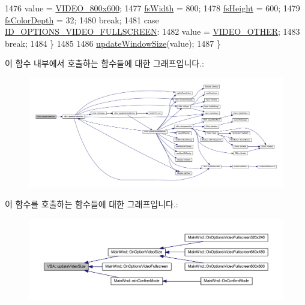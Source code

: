 \begin{DoxyCode}
1476     value = \mbox{\hyperlink{_v_b_a_8h_a531c35e38ede3ea4e5ba5afb24b29493a1849e033b4567855b2eaba899ed43c17}{VIDEO\_800x600}};
1477     \mbox{\hyperlink{class_v_b_a_a92ef1c149914189da4d110d6dada54bb}{fsWidth}} = 800;
1478     \mbox{\hyperlink{class_v_b_a_a1e59d9254f1cb6420502c537c35dd5ec}{fsHeight}} = 600;
1479     \mbox{\hyperlink{class_v_b_a_a1baf02b3f4ad129bfd713f1a132e96b9}{fsColorDepth}} = 32;
1480     \textcolor{keywordflow}{break};
1481   \textcolor{keywordflow}{case} \mbox{\hyperlink{resource_8h_abc37fbc81d7b51ec9dc9e4cb941e2fd5}{ID\_OPTIONS\_VIDEO\_FULLSCREEN}}:
1482     value = \mbox{\hyperlink{_v_b_a_8h_a531c35e38ede3ea4e5ba5afb24b29493acab4f90135b50a88563541e679dd6cee}{VIDEO\_OTHER}};
1483     \textcolor{keywordflow}{break};
1484   \}
1485 
1486   \mbox{\hyperlink{class_v_b_a_ac278ece4958310ce2ef8751afbad08f3}{updateWindowSize}}(value);
1487 \}
\end{DoxyCode}
이 함수 내부에서 호출하는 함수들에 대한 그래프입니다.\+:
\nopagebreak
\begin{figure}[H]
\begin{center}
\leavevmode
\includegraphics[width=350pt]{class_v_b_a_afe121e9ee080eca73146eb339408a148_cgraph}
\end{center}
\end{figure}
이 함수를 호출하는 함수들에 대한 그래프입니다.\+:
\nopagebreak
\begin{figure}[H]
\begin{center}
\leavevmode
\includegraphics[width=350pt]{class_v_b_a_afe121e9ee080eca73146eb339408a148_icgraph}
\end{center}
\end{figure}
\mbox{\label{class_v_b_a_ac278ece4958310ce2ef8751afbad08f3}} 

